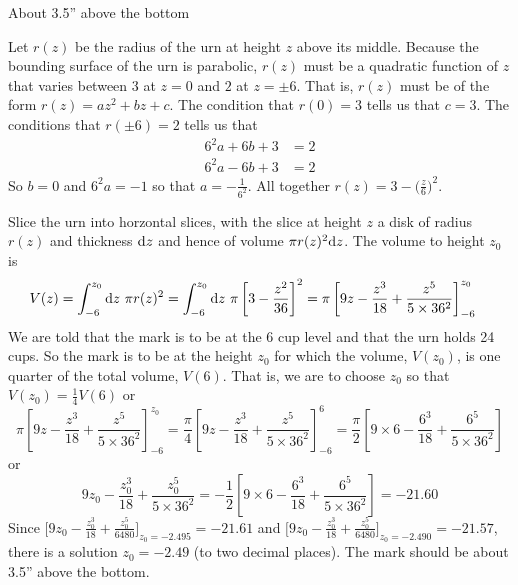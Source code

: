 %

\begin{answer}
About 3.5'' above the bottom
\end{answer}

\begin{solution}
 Let $r(z)$ be the radius of the urn at height $z$ above its middle.
Because the bounding surface of the urn is parabolic, $r(z)$ must be a
quadratic function of $z$ that varies between $3$ at $z=0$ and $2$ at $z=\pm
6$. That is, $r(z)$ must be of the form $r(z)=az^2+bz+c$.
The condition that $r(0)=3$ tells us that $c=3$. The conditions that 
$r(\pm 6)=2$ tells us that 
\begin{align*}
6^2a + 6b + 3 &=2 \\ 
6^2a - 6b + 3 &=2
\end{align*} 
So $b=0$ and $6^2a=-1$ so that $a=-\frac{1}{6^2}$.
All together $r(z)=3-\big(\frac{z}{6}\big)^2$. 

Slice
the urn into horzontal slices, with the slice at height $z$ a disk of radius 
$r(z)$ and thickness $\mathrm{d}z$ and hence of volume $\pi r(z)^2\mathrm{d}z$. The volume
to height $z_0$ is
\begin{align*}
V(z)
&=\int_{-6}^{z_0} \mathrm{d}z\ \pi r(z)^2
=\int_{-6}^{z_0} \mathrm{d}z\ \pi\left[3-\frac{z^2}{36}\right]^2
=\pi\left[9z-\frac{z^3}{18}+\frac{z^5}{5\times36^2}\right]_{-6}^{z_0}\cr
\end{align*}
We are told that the mark is to be at the 6 cup level and that the urn holds 24 cups. So the mark is to be at the height $z_0$ for which the volume, $V(z_0)$,
is one quarter of the total volume, $V(6)$.  
That is, we are to choose $z_0$ so that $V(z_0)=\frac{1}{4} V(6)$ or
\begin{equation*}
\pi\left[9z-\frac{z^3}{18}+\frac{z^5}{5\times36^2}\right]_{-6}^{z_0}
=\frac{\pi}{4}\left[9z-\frac{z^3}{18}+\frac{z^5}{5\times36^2}\right]_{-6}^{6}
=\frac{\pi}{2}\left[9\times 6-\frac{6^3}{18}+\frac{6^5}{5\times36^2}\right]
\end{equation*} 
or
\begin{equation*}
9z_0-\frac{z_0^3}{18}+\frac{z_0^5}{5\times36^2}
=-\frac{1}{2}\left[9\times 6-\frac{6^3}{18}+\frac{6^5}{5\times36^2}\right]
=-21.60
\end{equation*}
Since $\Big[9z_0-\frac{z_0^3}{18}+\frac{z_0^5}{6480}\Big]_{z_0=-2.495}=-21.61$
and $\Big[9z_0-\frac{z_0^3}{18}+\frac{z_0^5}{6480}\Big]_{z_0=-2.490}=-21.57$,
there is a solution $z_0=-2.49$ (to two decimal places). The mark should
be about 3.5'' above the bottom.
\end{solution}

